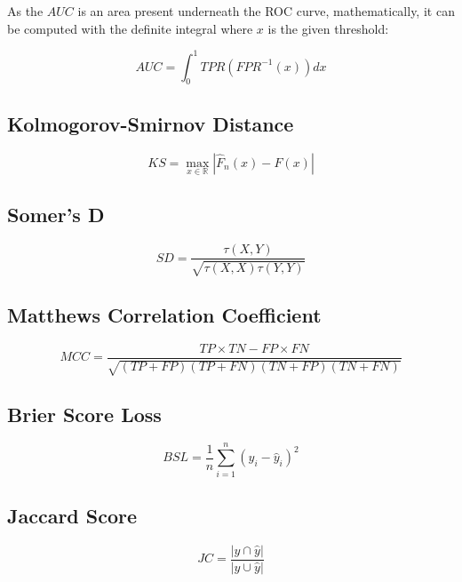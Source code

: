 As the $AUC$ is an area present underneath the ROC curve, mathematically, it can be computed with the definite integral where $x$ is the given threshold:

\begin{equation}\label{eq}
    AUC = \int_{0}^{1} TPR \left(FPR^{-1}\left(x \right)\right) dx
\end{equation}

\subsection{Kolmogorov-Smirnov Distance}

\begin{equation}\label{eq}
    KS = \max_{x \in \mathbb{R}} \left| \hat{F}_n \left(x \right) - F \left(x \right) \right|
\end{equation}


\subsection{Somer's D}

\begin{equation}\label{eq}
    SD = \frac{\tau \left(X, Y\right)}{\sqrt{\tau \left(X, X\right) \tau \left(Y, Y\right)}}
\end{equation}


\subsection{Matthews Correlation Coefficient}

\begin{equation}\label{eq}
    MCC = \frac{TP \times TN - FP \times FN}{\sqrt{(TP + FP) (TP + FN) (TN + FP) (TN + FN)}}
\end{equation}


\subsection{Brier Score Loss}

\begin{equation}\label{eq}
    BSL = \frac{1}{n} \sum_{i=1}^{n} (y_i - \hat{y}_i)^2
\end{equation}


\subsection{Jaccard Score}


\begin{equation}\label{eq}
    JC = \frac{|y \cap \hat{y} |}{|y \cup \hat{y} |}
    \end{equation}


